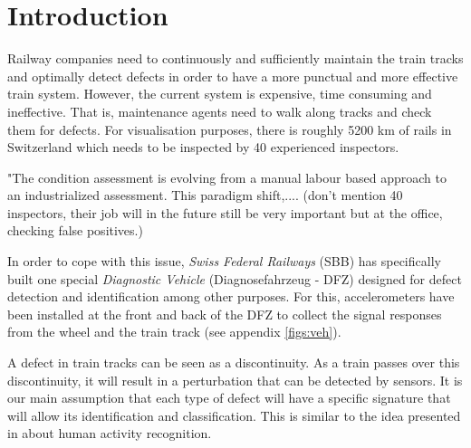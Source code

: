 



%



\maketitle

%
{
  \hypersetup{linkcolor=black}
  \tableofcontents
   
}
\newpage
\chapter{Introduction}
Railway companies need to continuously and sufficiently maintain the train tracks and optimally detect defects in order to have a more punctual and more effective train system. However, the current system is expensive, time consuming and ineffective. That is, maintenance agents need to walk along tracks and check them for defects. For visualisation purposes, there is roughly 5200 km of rails in Switzerland which needs to be inspected by 40 experienced inspectors.


"The condition assessment is evolving from a manual labour based approach to an industrialized assessment. This paradigm shift,.... (don't mention 40 inspectors, their job will in the future still be very important but at the office, checking false positives.)

In order to cope with this issue, \textit{Swiss Federal Railways} (SBB) has specifically built one special \textit{Diagnostic Vehicle} (Diagnosefahrzeug - DFZ) designed for defect detection and identification among other purposes. For this, accelerometers have been installed at the front and back of the DFZ to collect the signal responses from the wheel and the train track (see appendix \ref{figs:veh}).

A defect in train tracks can be seen as a discontinuity. As a train passes over this discontinuity, it will result in a perturbation that can be detected by sensors. It is our main assumption that each type of defect will have a specific signature that will allow its identification and classification. This is similar to the idea presented in \cite{Introduc31:online} about human activity recognition.

